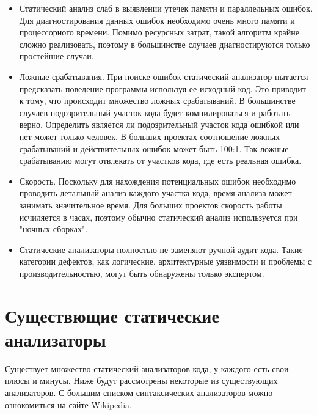 \begin{itemize}
	\item Статический анализ слаб в выявлении утечек памяти и параллельных ошибок.
	Для диагностирования данных ошибок необходимо очень много памяти и процессорного времени. 
Помимо ресурсных затрат, такой алгоритм крайне сложно реализовать, поэтому в большинстве случаев 
диагностируются только простейшие случаи.  
	
	\item Ложные срабатывания.
	При поиске ошибок статический анализатор пытается предсказать поведение программы используя
ее исходный код. Это приводит к тому, что происходит множество ложных срабатываний. В большинстве случаев 
подозрительный участок кода будет компилироваться и работать верно. Определить является ли  
подозрительный участок кода ошибкой или нет может только человек. В больших проектах соотношение 
ложных срабатываний и действительных ошибок может быть 100:1. Так ложные срабатыванию могут 
отвлекать от участков кода, где есть реальная ошибка.
	
	\item Скорость.
	Поскольку для нахождения потенциальных ошибок необходимо проводить детальный анализ каждого
участка кода, время анализа может занимать значительное время. Для больших проектов скорость работы
исчиляется в часах, поэтому обычно статический анализ используется при "ночных сборках".
	
	\item Статические анализаторы полностью не заменяют ручной аудит кода. 
	Такие категории дефектов, как логические, архитектурные уязвимости и проблемы с производительностью,
могут быть обнаружены только экспертом.
\end{itemize}

\section{Существющие статические анализаторы}

Существует множество статический анализаторов кода, у каждого есть свои плюсы и минусы. 
Ниже будут рассмотрены некоторые из существующих анализаторов. С большим списком синтаксических
анализаторов можно ознокомиться на сайте Wikipedia.

